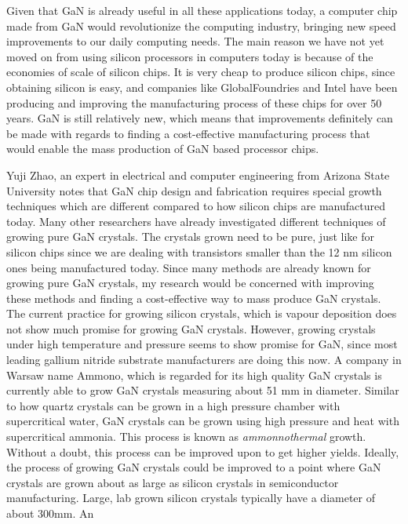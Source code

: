 \documentclass[letterpaper]{letter}
\begin{document}
\begin{letter}
Given that GaN is already useful in all these applications today, a
computer chip made from GaN would revolutionize the computing industry,
bringing new speed improvements to our daily computing needs. The main reason
we have not yet moved on from using silicon processors in computers today is
because of the economies of scale of silicon chips. It is very cheap to produce
silicon chips, since obtaining silicon is easy, and companies like
GlobalFoundries and Intel have been producing and improving the manufacturing
process of these chips for over 50 years. GaN is still relatively new,
which means that improvements definitely can be made with regards to finding a
cost-effective manufacturing process that would enable the mass production of GaN
based processor chips.


Yuji Zhao, an expert in electrical and computer engineering from Arizona State
University %
notes that GaN chip design and fabrication requires special growth techniques
which are different compared to how silicon chips are manufactured today. Many
other researchers have already investigated different techniques of growing pure
GaN crystals. The crystals grown need to be pure, just like for silicon chips
since we are dealing with transistors smaller than the 12 nm silicon ones being
manufactured today. Since many methods are already known for growing pure GaN
crystals, my research would be concerned with improving these methods and
finding a cost-effective way to mass produce GaN crystals. The current practice
for growing silicon crystals, which is vapour deposition does not show much
promise for growing GaN crystals. However, growing crystals under high
temperature and pressure seems to show promise for GaN, since most leading
gallium nitride substrate manufacturers are doing this now. A company in Warsaw
name Ammono, which is regarded for its high quality GaN crystals is currently
able to grow GaN crystals measuring about 51 mm in diameter. Similar to how
quartz crystals can be grown in a high pressure chamber with supercritical
water, GaN crystals can be grown using high pressure and heat with supercritical
ammonia. This process is known as \textit{ammonnothermal} growth. Without a
doubt, this process can be improved upon to get higher yields. Ideally, the
process of growing GaN crystals could be improved to a point where GaN crystals
are grown about as large as silicon crystals in semiconductor manufacturing.
Large, lab grown silicon crystals typically have a diameter of about 300mm. An

\end{letter}
\end{document}
